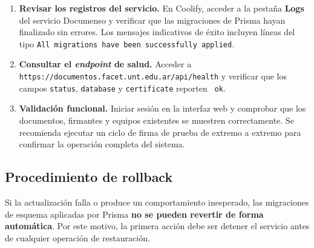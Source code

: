\begin{enumerate}
    \item \textbf{Revisar los registros del servicio.} En Coolify, acceder a la pestaña \textbf{Logs} del servicio Documenso y verificar que las migraciones de Prisma hayan finalizado sin errores. Los mensajes indicativos de éxito incluyen líneas del tipo \texttt{All migrations have been successfully applied}.

    \item \textbf{Consultar el \textit{endpoint} de salud.} Acceder a \nolinkurl{https://documentos.facet.unt.edu.ar/api/health} y verificar que los campos \texttt{status}, \texttt{database} y \texttt{certificate} reporten \texttt{ ok}.

    \item \textbf{Validación funcional.} Iniciar sesión en la interfaz web y comprobar que los documentos, firmantes y equipos existentes se muestren correctamente. Se recomienda ejecutar un ciclo de firma de prueba de extremo a extremo para confirmar la operación completa del sistema.
\end{enumerate}

\subsection{Procedimiento de rollback}

Si la actualización falla o produce un comportamiento inesperado, las migraciones de esquema aplicadas por Prisma \textbf{no se pueden revertir de forma automática}. Por este motivo, la primera acción debe ser detener el servicio antes de cualquier operación de restauración.

